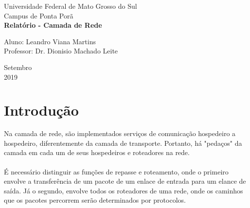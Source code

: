 \documentclass[a4paper, 12pt]{article}
\begin{document}

\begin{titlepage}
	\begin{center}
	

		\large{Universidade Federal de Mato Grosso do Sul}\\
		\large{Campus de Ponta Porã}\\ 
		\vspace{15pt}
        \vspace{95pt}
        \textbf{\LARGE{Relatório - Camada de Rede }}\\
		\vspace{3,5cm}
	\end{center}
	
	\begin{flushleft}
		\begin{tabbing}
			Aluno: Leandro Viana Martins\\
			Professor: Dr. Dionisio Machado Leite\\
	\end{tabbing}
 \end{flushleft}
	\vspace{1cm}
	
	\begin{center}
		\vspace{\fill}
			Setembro\\
            2019
	\end{center}
\end{titlepage}

\newpage
\section{Introdução}
Na camada de rede, são implementados serviços de comunicação hospedeiro a hospedeiro, diferentemente da camada de 
transporte. Portanto, há "pedaços" da camada em cada um de seus hospedeiros e roteadores na rede.
\\
\\
É necessário distinguir as funções de repasse e roteamento, onde o primeiro envolve a transferência de um pacote de um enlace
de entrada para um elance de saída. Já o segundo, envolve todos os roteadores de uma rede, onde os caminhos que os pacotes 
percorrem serão determinados por protocolos.
\end{document}
